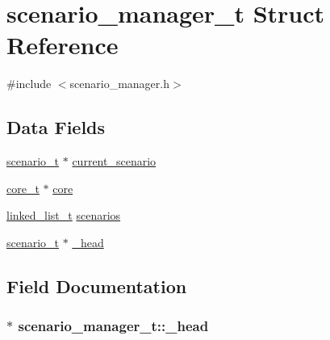 \hypertarget{structscenario__manager__t}{}\section{scenario\+\_\+manager\+\_\+t Struct Reference}
\label{structscenario__manager__t}


{\ttfamily \#include $<$scenario\+\_\+manager.\+h$>$}

\subsection*{Data Fields}
\begin{DoxyCompactItemize}
\item 
\hyperlink{structscenario__t}{scenario\+\_\+t} $\ast$ \hyperlink{structscenario__manager__t_aa74df73bef016afb248a2c2df004bc8e}{current\+\_\+scenario}
\item 
\hyperlink{structcore__t}{core\+\_\+t} $\ast$ \hyperlink{structscenario__manager__t_a4fff49d96cbc989dad6aea0594165a5d}{core}
\item 
\hyperlink{structlinked__list__t}{linked\+\_\+list\+\_\+t} \hyperlink{structscenario__manager__t_a3143c7412ad621c612faf9549b2826ad}{scenarios}
\item 
\hyperlink{structscenario__t}{scenario\+\_\+t} $\ast$ \hyperlink{structscenario__manager__t_ad359cd8fa8497fcd1cf96c5b549cb947}{\+\_\+head}
\end{DoxyCompactItemize}


\subsection{Field Documentation}
\subsubsection[{\texorpdfstring{\+\_\+head}{\_head}}]{$\ast$ scenario\+\_\+manager\+\_\+t\+::\+\_\+head}\hypertarget{structscenario__manager__t_ad359cd8fa8497fcd1cf96c5b549cb947}{}\label{structscenario__manager__t_ad359cd8fa8497fcd1cf96c5b549cb947}
